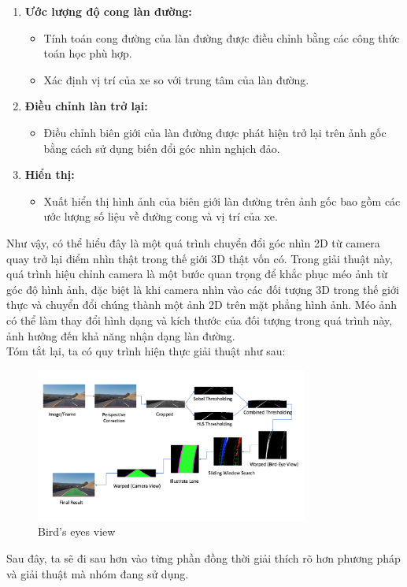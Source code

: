 \begin{enumerate}
    \item \textbf{Ước lượng độ cong làn đường:}
    \begin{itemize}
        \item Tính toán cong đường của làn đường được điều chỉnh bằng các công thức toán học phù hợp.
        \item Xác định vị trí của xe so với trung tâm của làn đường.
    \end{itemize}

    \item \textbf{Điều chỉnh làn trở lại:}
    \begin{itemize}
        \item Điều chỉnh biên giới của làn đường được phát hiện trở lại trên ảnh gốc bằng cách sử dụng biến đổi góc nhìn nghịch đảo.
    \end{itemize}

    \item \textbf{Hiển thị:}
    \begin{itemize}
        \item Xuất hiển thị hình ảnh của biên giới làn đường trên ảnh gốc bao gồm các ước lượng số liệu về đường cong và vị trí của xe.
    \end{itemize}
\end{enumerate}
\newline 
Như vậy, có thể hiểu đây là một quá trình chuyển đổi góc nhìn 2D từ camera quay trở lại điểm nhìn thật trong thế giới 3D thật vốn có. Trong giải thuật này, quá trình hiệu chỉnh camera là một bước quan trọng để khắc phục méo ảnh từ góc độ hình ảnh, đặc biệt là khi camera nhìn vào các đối tượng 3D trong thế giới thực và chuyển đổi chúng thành một ảnh 2D trên mặt phẳng hình ảnh. Méo ảnh có thể làm thay đổi hình dạng và kích thước của đối tượng trong quá trình này, ảnh hưởng đến khả năng nhận dạng làn đường.\\
\newline
Tóm tắt lại, ta có quy trình hiện thực giải thuật như sau:
\begin{figure}[htbp]
    \centering
    \includegraphics[width = 0.8\textwidth]{images/3-lane/pipeline.png}
    \caption{Bird's eyes view}
\end{figure}
\newline 
Sau đây, ta sẽ đi sau hơn vào từng phần đồng thời giải thích rõ hơn phương pháp và giải thuật mà nhóm đang sử dụng.

